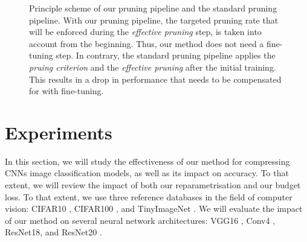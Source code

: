 \begin{figure}
  \centering
  \caption{ Principle scheme of our pruning pipeline and the standard
    pruning pipeline. With our pruning pipeline, the targeted pruning rate that will
    be enforced during the \emph{effective pruning} step, is taken into account
    from the beginning. Thus, our method does not need a fine-tuning step. In
    contrary, the standard pruning pipeline applies the \emph{pruing criterion}
    and the \emph{effective pruning} after the initial training. This results in a
    drop in performance that needs to be compensated for with fine-tuning.}
  \label{fig:chap1:pruning_pipeline_comparison}
\end{figure}


\section{Experiments}
\label{sec:chap1:experiments}
In this section, we will study the effectiveness of our method for compressing
\aclp{CNN} image classification models, as well as its impact on accuracy. To
that extent, we will review the impact of both our reparametrisation and our
budget loss. To that extent, we use three reference databases in the field of
computer vision: CIFAR10 \cite{CIFARdataset}, CIFAR100 \cite{CIFARdataset}, and
TinyImageNet \cite{TinyImageNet}. We will evaluate the impact of our method on
several neural network architectures: VGG16
\cite{DBLP:journals/corr/SimonyanZ14a}, Conv4 \cite{DBLP:conf/iclr/FrankleC19},
ResNet18, and ResNet20 \cite{DBLP:conf/cvpr/HeZRS16}. \\

